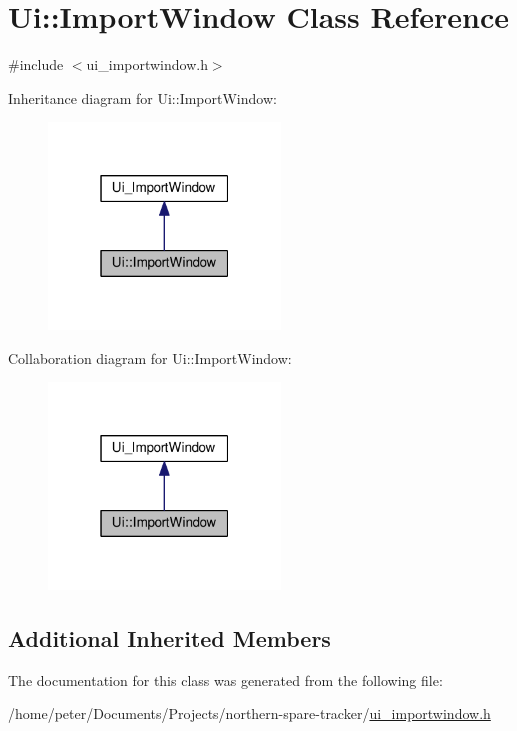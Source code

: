 \hypertarget{class_ui_1_1_import_window}{}\section{Ui\+:\+:Import\+Window Class Reference}
\label{class_ui_1_1_import_window}


{\ttfamily \#include $<$ui\+\_\+importwindow.\+h$>$}



Inheritance diagram for Ui\+:\+:Import\+Window\+:
\nopagebreak
\begin{figure}[H]
\begin{center}
\leavevmode
\includegraphics[width=175pt]{class_ui_1_1_import_window__inherit__graph}
\end{center}
\end{figure}


Collaboration diagram for Ui\+:\+:Import\+Window\+:
\nopagebreak
\begin{figure}[H]
\begin{center}
\leavevmode
\includegraphics[width=175pt]{class_ui_1_1_import_window__coll__graph}
\end{center}
\end{figure}
\subsection*{Additional Inherited Members}


The documentation for this class was generated from the following file\+:\begin{DoxyCompactItemize}
\item 
/home/peter/\+Documents/\+Projects/northern-\/spare-\/tracker/\hyperlink{ui__importwindow_8h}{ui\+\_\+importwindow.\+h}\end{DoxyCompactItemize}
